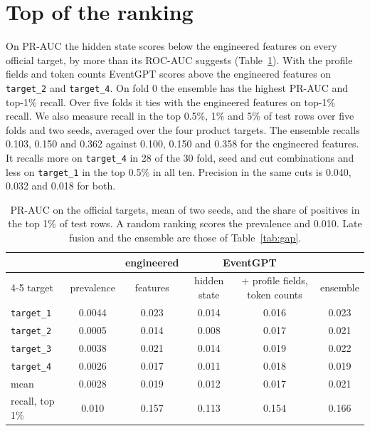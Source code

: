 \documentclass[12pt]{article}
\newcommand{\tok}[1]{\texttt{#1}}
\begin{document}
\section{Top of the ranking}\label{app:top}

On PR-AUC the hidden state scores below the engineered features on every official target, by more than its ROC-AUC suggests (Table~\ref{tab:main-pr}). With the profile fields and token counts EventGPT scores above the engineered features on \tok{target\_2} and \tok{target\_4}. On fold 0 the ensemble has the highest PR-AUC and top-1\% recall. Over five folds it ties with the engineered features on top-1\% recall. We also measure recall in the top 0.5\%, 1\% and 5\% of test rows over five folds and two seeds, averaged over the four product targets. The ensemble recalls 0.103, 0.150 and 0.362 against 0.100, 0.150 and 0.358 for the engineered features. It recalls more on \tok{target\_4} in 28 of the 30 fold, seed and cut combinations and less on \tok{target\_1} in the top 0.5\% in all ten. Precision in the same cuts is 0.040, 0.032 and 0.018 for both.

\begin{table}[htbp]
\centering
\small
\setlength{\tabcolsep}{4pt}
\caption{PR-AUC on the official targets, mean of two seeds, and the share of positives in the top 1\% of test rows. A random ranking scores the prevalence and 0.010. Late fusion and the ensemble are those of Table~\ref{tab:gap}.}
\label{tab:main-pr}
\begin{tabular}{lccccc}
\toprule
 & & engineered & \multicolumn{2}{c}{EventGPT} & \\
\cmidrule(lr){4-5}
target & prevalence & features & hidden state & + profile fields, token counts & ensemble \\
\midrule
\tok{target\_1} & 0.0044 & 0.023 & 0.014 & 0.016 & 0.023 \\
\tok{target\_2} & 0.0005 & 0.014 & 0.008 & 0.017 & 0.021 \\
\tok{target\_3} & 0.0038 & 0.021 & 0.014 & 0.019 & 0.022 \\
\tok{target\_4} & 0.0026 & 0.017 & 0.011 & 0.018 & 0.019 \\
mean & 0.0028 & 0.019 & 0.012 & 0.017 & 0.021 \\
\midrule
recall, top 1\% & 0.010 & 0.157 & 0.113 & 0.154 & 0.166 \\
\bottomrule
\end{tabular}
\end{table}
\end{document}
